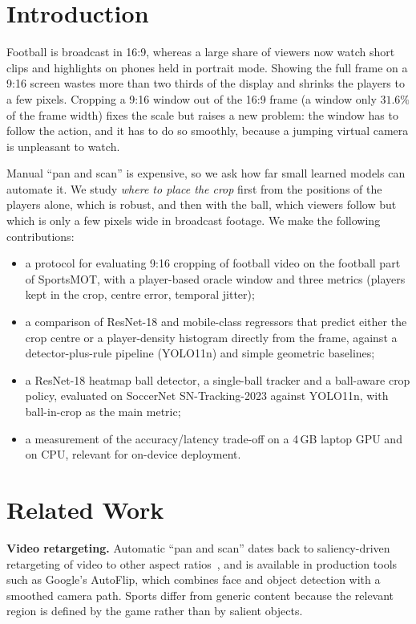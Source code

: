\documentclass[conference]{IEEEtran}
\begin{document}
\section{Introduction}
Football is broadcast in 16:9, whereas a large share of viewers now watch short clips and highlights on phones held in portrait mode. Showing the full frame on a 9:16 screen wastes more than two thirds of the display and shrinks the players to a few pixels. Cropping a 9:16 window out of the 16:9 frame (a window only $31.6\%$ of the frame width) fixes the scale but raises a new problem: the window has to follow the action, and it has to do so smoothly, because a jumping virtual camera is unpleasant to watch.

Manual ``pan and scan'' is expensive, so we ask how far small learned models can automate it. We study \emph{where to place the crop} first from the positions of the players alone, which is robust, and then with the ball, which viewers follow but which is only a few pixels wide in broadcast footage. We make the following contributions:
\begin{itemize}
\item a protocol for evaluating 9:16 cropping of football video on the football part of SportsMOT, with a player-based oracle window and three metrics (players kept in the crop, centre error, temporal jitter);
\item a comparison of ResNet-18 and mobile-class regressors that predict either the crop centre or a player-density histogram directly from the frame, against a detector-plus-rule pipeline (YOLO11n) and simple geometric baselines;
\item a ResNet-18 heatmap ball detector, a single-ball tracker and a ball-aware crop policy, evaluated on SoccerNet SN-Tracking-2023 against YOLO11n, with ball-in-crop as the main metric;
\item a measurement of the accuracy/latency trade-off on a 4\,GB laptop GPU and on CPU, relevant for on-device deployment.
\end{itemize}

\section{Related Work}
\textbf{Video retargeting.} Automatic ``pan and scan'' dates back to saliency-driven retargeting of video to other aspect ratios~\cite{liu2006}, and is available in production tools such as Google's AutoFlip, which combines face and object detection with a smoothed camera path. Sports differ from generic content because the relevant region is defined by the game rather than by salient objects.
\end{document}

